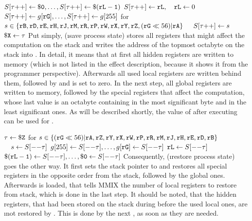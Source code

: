 \instrtblsix
	{}
	{$S[\tau{\tt ++}] \leftarrow {\tt \$0}, \dots, S[\tau{\tt ++}] \leftarrow {\tt \$({\tt rL} - 1)}$}
	{$S[\tau{\tt ++}] \leftarrow {\tt rL}, \quad {\tt rL} \leftarrow 0$}
	{$S[\tau{\tt ++}] \leftarrow g[{\tt rG}], \dots, S[\tau{\tt ++}] \leftarrow g[255]$}
	{for $s \in \{{\tt rB},{\tt rD},{\tt rE},{\tt rH},{\tt rJ},{\tt rM},{\tt rR},{\tt rP},{\tt rW},{\tt rX},{\tt rY},{\tt rZ},({\tt rG} \ll 56)|{\tt rA}\}$}
	{$\quad S[\tau{\tt ++}] \leftarrow s$}
	{${\tt \$X} \leftarrow \tau$}
\noindent Put simply,  (\i{save process state}) stores all registers that might affect the computation on the stack and writes the address of the topmost octabyte on the stack into . In detail, it means that at first all hidden registers are written to memory (which is not listed in the effect description, because it shows it from the programmer perspective). Afterwards all used local registers are written behind them, followed by  and  is set to zero. In the next step, all global registers are written to memory, followed by the special registers that affect the computation, whose last value is an octabyte containing  in the most significant byte and  in the least significant ones. As will be described shortly, the value of  after executing  can be used for . \citep[pg. 34]{mmix-doc}

\instrtblsix
	{}
	{$\tau \leftarrow {\tt \$Z}$}
	{for $s \in \{({\tt rG} \ll 56)|{\tt rA},{\tt rZ},{\tt rY},{\tt rX},{\tt rW},{\tt rP},{\tt rR},{\tt rM},{\tt rJ},{\tt rH},{\tt rE},{\tt rD},{\tt rB}\}$}
	{$\quad s \leftarrow S[{\tt --}\tau]$}
	{$g[255] \leftarrow S[{\tt --}\tau], \dots, g[{\tt rG}] \leftarrow S[{\tt --}\tau]$}
	{${\tt rL} \leftarrow S[{\tt --}\tau]$}
	{${\tt \$({\tt rL} - 1)} \leftarrow S[{\tt --}\tau], \dots, {\tt \$0} \leftarrow S[{\tt --}\tau]$}
\noindent Consequently,  (\i{restore process state}) goes the other way. It first sets the stack pointer to  and restores all special registers in the opposite order from the stack, followed by the global ones. Afterwards  is loaded, that tells MMIX the number of local registers to restore from stack, which is done in the last step. \citep[pg. 34]{mmix-doc} It should be noted, that the hidden registers, that had been stored on the stack during  before the used local ones, are \i{not} restored by . This is done by the next , \ie as soon as they are needed.


